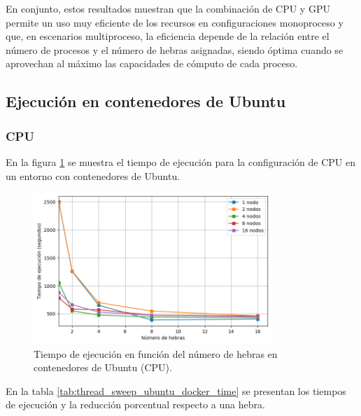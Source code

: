 En conjunto, estos resultados muestran que la combinación de CPU y GPU permite un uso muy eficiente de los recursos en configuraciones monoproceso y que, en escenarios multiproceso, la eficiencia depende de la relación entre el número de procesos y el número de hebras asignadas, siendo óptima cuando se aprovechan al máximo las capacidades de cómputo de cada proceso.


\subsection{Ejecución en contenedores de Ubuntu}
\subsubsection{CPU}

En la figura \ref{fig:thread_sweep_ubuntu_docker_time} se muestra el tiempo de ejecución para la configuración de CPU en un entorno con contenedores de Ubuntu.

\begin{figure}[ht]
    \centering
    \includegraphics[width=0.8\textwidth]{imagenes/cap5/thread_sweep_ubuntu_docker_time.png}
    \caption{Tiempo de ejecución en función del número de hebras en contenedores de Ubuntu (CPU).}
    \label{fig:thread_sweep_ubuntu_docker_time}
\end{figure}

En la tabla \ref{tab:thread_sweep_ubuntu_docker_time} se presentan los tiempos de ejecución y la reducción porcentual respecto a una hebra.

